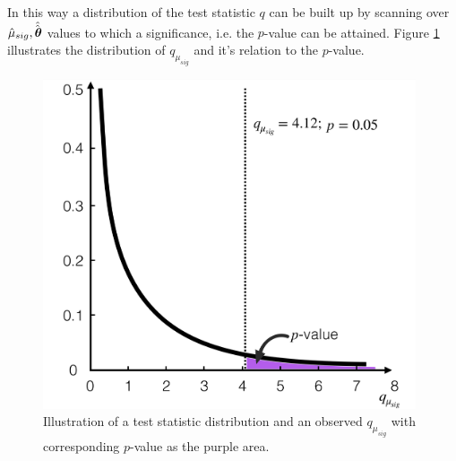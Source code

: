 In this way a distribution of the test statistic $q$ can be built up by scanning over $\hat{\mu}_{sig},\hat{\vphantom{\rule{1pt}{0.1ex}}\hat{\boldsymbol{\theta}}}$ values to which a significance, i.e. the $p$-value can be attained.  
Figure \ref{fig:teststat} illustrates the distribution of $q_{\mu_{sig}}$ and it's relation to the $p$-value. 
\begin{figure}[tbp]
  \begin{center}
    \includegraphics[width=0.98\textwidth]{figs/rpvthreel/teststatdistpvalue.png}
  \end{center}
  \caption[Illustration of a test statistic distribution and an observed $q_{\mu_{sig}}$ with corresponding $p$-value.]
          {Illustration of a test statistic distribution and an observed $q_{\mu_{sig}}$ with corresponding $p$-value as the purple area.}
          \label{fig:teststat}
\end{figure}


